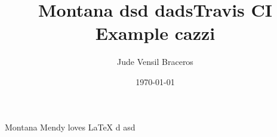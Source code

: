 \documentclass{article}
\title{Montana dsd  dadsTravis CI Example cazzi}
\author{Jude Vensil Braceros}
\date{\today}
\begin{document}
\maketitle

Montana Mendy loves LaTeX d asd
\end{document}
